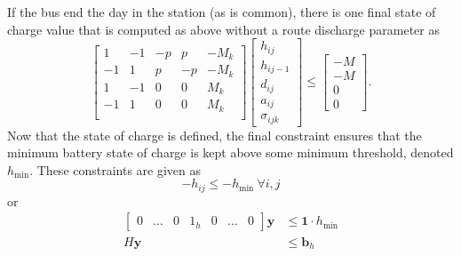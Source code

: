 If the bus end the day in the station (as is common), there is one final state of charge value that is computed as above without a route discharge parameter as
\begin{equation}
\begin{bmatrix}1  & -1 & -p & p   & -M_k \\
		       -1 & 1  & p  & -p  & -M_k \\
		       1  & -1 & 0             & 0              & M_k  \\
		       -1 & 1  & 0             & 0              & M_k  \\
	\end{bmatrix}
	\begin{bmatrix}h_{ij} \\ h_{ij-1} \\ d_{ij} \\ a_{ij} \\ \sigma_{ijk} \end{bmatrix} \le 
		\begin{bmatrix}- M \\ - M \\ 0 \\ 0 \end{bmatrix}.
\end{equation}
Now that the state of charge is defined, the final constraint ensures that the minimum battery state of charge is kept above some minimum threshold, denoted $h_{\text{min}}$. These constraints are given as
\begin{equation}
	-h_{ij} \le -h_{\text{min}} \ \forall i,j
\end{equation}
or 
\begin{equation} \begin{aligned}
	\begin{bmatrix}0 & \hdots & 0 & 1_{h} & 0 & \hdots & 0\end{bmatrix} \mathbf{y} &\le \mathbf{1}\cdot h_{\text{min}}\\ 
		H\mathbf{y} &\le \mathbf{b}_h
\end{aligned} \end{equation}

